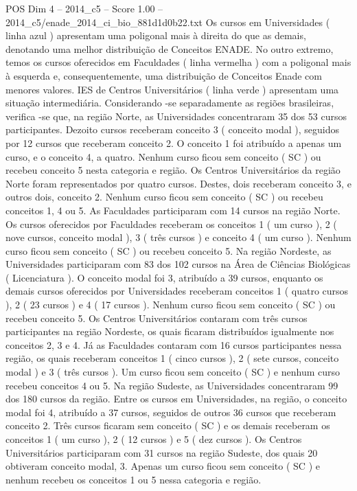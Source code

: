 \begin{textsample}{POS Dim 4 – 2014\_c5 – Score 1.00 – 2014\_c5/enade\_2014\_ci\_bio\_881d1d0b22.txt}
Os cursos em Universidades ( linha azul ) apresentam uma poligonal mais à direita do que as demais, denotando uma melhor distribuição de Conceitos ENADE.
No outro extremo, temos os cursos oferecidos em Faculdades ( linha vermelha ) com a poligonal mais à esquerda e, consequentemente, uma distribuição de Conceitos Enade com menores valores.
IES de Centros Universitários ( linha verde ) apresentam uma situação intermediária.
Considerando -se separadamente as regiões brasileiras, verifica -se que, na região Norte, as Universidades concentraram 35 dos 53 cursos participantes.
Dezoito cursos receberam conceito 3 ( conceito modal ), seguidos por 12 cursos que receberam conceito 2.
O conceito 1 foi atribuído a apenas um curso, e o conceito 4, a quatro.
Nenhum curso ficou sem conceito ( SC ) ou recebeu conceito 5 nesta categoria e região.
Os Centros Universitários da região Norte foram representados por quatro cursos.
Destes, dois receberam conceito 3, e outros dois, conceito 2.
Nenhum curso ficou sem conceito ( SC ) ou recebeu conceitos 1, 4 ou 5.
As Faculdades participaram com 14 cursos na região Norte.
Os cursos oferecidos por Faculdades receberam os conceitos 1 ( um curso ), 2 ( nove cursos, conceito modal ), 3 ( três cursos ) e conceito 4 ( um curso ).
Nenhum curso ficou sem conceito ( SC ) ou recebeu conceito 5.
Na região Nordeste, as Universidades participaram com 83 dos 102 cursos na Área de Ciências Biológicas ( Licenciatura ).
O conceito modal foi 3, atribuído a 39 cursos, enquanto os demais cursos oferecidos por Universidades receberam conceitos 1 ( quatro cursos ), 2 ( 23 cursos ) e 4 ( 17 cursos ).
Nenhum curso ficou sem conceito ( SC ) ou recebeu conceito 5.
Os Centros Universitários contaram com três cursos participantes na região Nordeste, os quais ficaram distribuídos igualmente nos conceitos 2, 3 e 4.
Já as Faculdades contaram com 16 cursos participantes nessa região, os quais receberam conceitos 1 ( cinco cursos ), 2 ( sete cursos, conceito modal ) e 3 ( três cursos ).
Um curso ficou sem conceito ( SC ) e nenhum curso recebeu conceitos 4 ou 5.
Na região Sudeste, as Universidades concentraram 99 dos 180 cursos da região.
Entre os cursos em Universidades, na região, o conceito modal foi 4, atribuído a 37 cursos, seguidos de outros 36 cursos que receberam conceito 2.
Três cursos ficaram sem conceito ( SC ) e os demais receberam os conceitos 1 ( um curso ), 2 ( 12 cursos ) e 5 ( dez cursos ).
Os Centros Universitários participaram com 31 cursos na região Sudeste, dos quais 20 obtiveram conceito modal, 3.
Apenas um curso ficou sem conceito ( SC ) e nenhum recebeu os conceitos 1 ou 5 nessa categoria e região.

\end{textsample}
